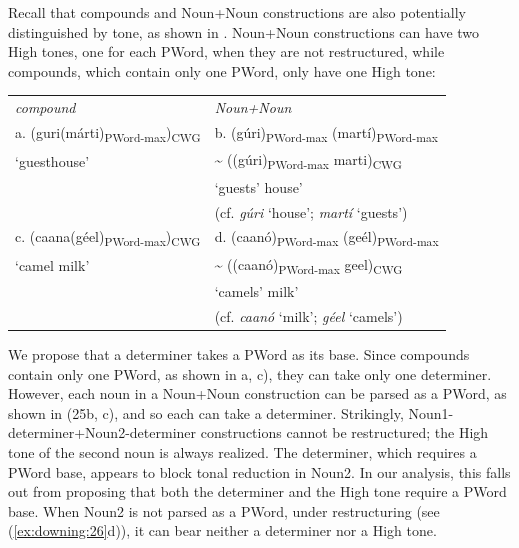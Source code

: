\documentclass[output=paper]{langscibook}
\begin{document}
Recall that compounds and Noun+Noun constructions are also potentially distinguished by tone, as shown in . Noun+Noun constructions can have two High tones, one for each PWord, when they are not restructured, while compounds, which contain only one PWord, only have one High tone:

\ea \label{ex:downing:25}
\begin{tabularx}{\textwidth}{l | l}
 \textit{compound} &  \textit{Noun+Noun}\\
 \cline{1-2}
 
a. (guri(márti)\textsubscript{PWord-max})\textsubscript{CWG}   & b.  (gúri)\textsubscript{PWord-max} (martí)\textsubscript{PWord-max}\\
  ‘guesthouse’                                              & {\textasciitilde} ((gúri)\textsubscript{PWord-max} marti)\textsubscript{CWG}\\

                                                            & ‘guests’ house’\\
                                                            & (cf. \textit{gúri} ‘house’; \textit{martí} ‘guests’)\\
\cline{1-2}
c. (caana(géel)\textsubscript{PWord-max})\textsubscript{CWG}   & d.  (caanó)\textsubscript{PWord-max} (geél)\textsubscript{PWord-max}\\
  ‘camel milk’                                              & {\textasciitilde} ((caanó)\textsubscript{PWord-max} geel)\textsubscript{CWG} \\
                                                            & ‘camels’ milk’\\
                                                            & (cf. \textit{caanó} ‘milk’; \textit{géel} ‘camels’)\\
\cline{1-2}
\end{tabularx}
\z 

We propose that a determiner takes a PWord as its base. Since compounds contain only one PWord, as shown in a, c), they can take only one determiner. However, each noun in a Noun+Noun construction can be parsed as a PWord, as shown in (25b, c), and so each can take a determiner. Strikingly, Noun1-determiner+Noun2-determiner constructions cannot be restructured; the High tone of the second noun is always realized. The determiner, which requires a PWord base, appears to block tonal reduction in Noun2. In our analysis, this falls out from proposing that both the determiner and the High tone require a PWord base. When Noun2 is not parsed as a PWord, under restructuring (see (\ref{ex:downing:26}d)), it can bear neither a determiner nor a High tone.
\end{document}
